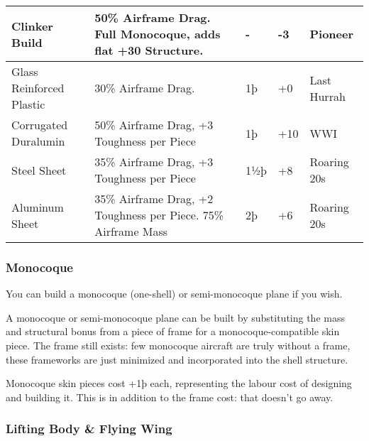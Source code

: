 \documentclass{article}
\begin{document}
\begin{tabular}{|l|l|l|l|l|}
    Clinker Build                & 50\% Airframe Drag. Full Monocoque, adds flat +30
    Structure.                   & -                                                       & -3         & Pioneer               \\\hline
    Glass Reinforced Plastic     & 30\% Airframe Drag.                                     & 1þ         & +0          & Last
    Hurrah                                                                                                                      \\\hline
    Corrugated Duralumin         & 50\% Airframe Drag, +3 Toughness per Piece              & 1þ         &
    +10                          & WWI                                                                                          \\\hline
    Steel Sheet                  & 35\% Airframe Drag, +3 Toughness per Piece              & 1½þ        & +8          &
    Roaring 20s                                                                                                                 \\\hline
    Aluminum Sheet               & 35\% Airframe Drag, +2 Toughness per Piece. 75\%
    Airframe Mass                & 2þ                                                      & +6         & Roaring 20s           \\\hline
\end{tabular}

\subsubsection{Monocoque}
\label{_Monocoque}

You can build a monocoque (one-shell) or semi-monocoque plane if you
wish.

A monocoque or semi-monocoque plane can be built by substituting the
mass and structural bonus from a piece of frame for a
monocoque-compatible skin piece. The frame still exists: few monocoque
aircraft are truly without a frame, these frameworks are just minimized
and incorporated into the shell structure.

Monocoque skin pieces cost +1þ each, representing the labour cost of
designing and building it. This is in addition to the frame cost: that
doesn't go away.

\subsubsection{Lifting Body \& Flying Wing}
\label{_Lifting Body \& Flying Wing}
\end{document}
